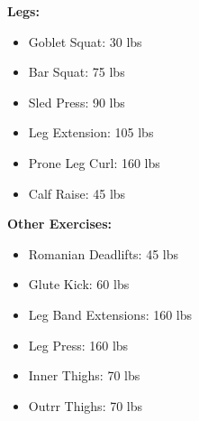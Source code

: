 \documentclass{article}
\begin{document}
\def\gs{30 }
\def\bs{75 }
\def\sp{90 }
\def\le{105 }
\def\plc{160 }
\def\cr{45 }

\def\rdl{45 }
\def\gk{60 }
\def\lbe{160 }
\def\lp{160 }
\def\it{70 }
\def\ot{70 }

\textbf{Legs:}
\begin{itemize}
	\item Goblet Squat: \hfill\gs lbs
	\item Bar Squat: \hfill\bs lbs
	\item Sled Press: \hfill\sp lbs
	\item Leg Extension: \hfill\le lbs
	\item Prone Leg Curl: \hfill\plc lbs
	\item Calf Raise: \hfill\cr lbs
\end{itemize}\leavevmode\newline

\textbf{Other Exercises:}
\begin{itemize}
	\item Romanian Deadlifts: \hfill\rdl lbs
	\item Glute Kick: \hfill\gk lbs
	\item Leg Band Extensions: \hfill\lbe lbs
	\item Leg Press: \hfill\lp lbs
 \item Inner Thighs: \hfill\it lbs
 \item Outrr Thighs: \hfill\ot lbs
\end{itemize}
\end{document}
